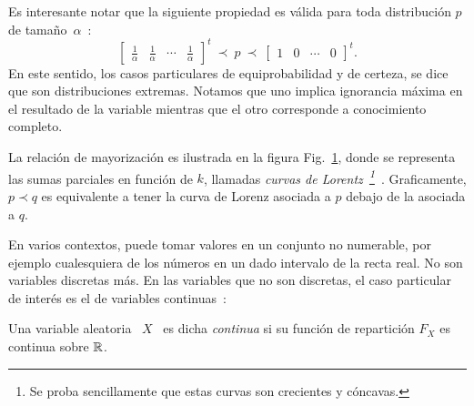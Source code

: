 Es  interesante  notar  que  la   siguiente  propiedad  es  v\'alida  para  toda
distribuci\'on $p$ de tama\~no~$\alpha$~\cite[p.~9,
  (6)-(8)]{MarOlk11}:
%
\[
\begin{bmatrix}     \frac1\alpha      &     \frac1\alpha     &      \cdots     &
  \frac1\alpha \end{bmatrix}^t  \ \prec \  p \ \prec  \ \begin{bmatrix} 1 &  0 &
  \cdots & 0 \end{bmatrix}^t.
\]
%
En este  sentido, los  casos particulares de  equiprobabilidad y de  certeza, se
dice  que  son  distribuciones  extremas.  Notamos que  uno  implica  ignorancia
m\'axima  en el  resultado de  la variable  mientras que  el otro  corresponde a
conocimiento completo.

La    relaci\'on    de    mayorizaci\'on    es   ilustrada    en    la    figura
Fig.~\ref{fig:MP:mayorizacionplot}, donde  se representa las  sumas parciales en
funci\'on   de  $k$,   llamadas  {\em   curvas  de   Lorentz~\footnote{Se  proba
    sencillamente      que      estas      curvas     son      crecientes      y
    c\'oncavas.}}~\cite{MarOlk11,   Lor05}.  Graficamente,   $p   \prec  q$   es
equivalente a tener  la curva de Lorenz  asociada a $p$ debajo de  la asociada a
$q$.
%
\begin{figure}[h!]
\begin{center}  \end{center}
%
\label{fig:MP:mayorizacionplot}
\end{figure}



\label{Ssec:MP:VAContinua}

En  varios contextos,  puede  tomar valores  en  un conjunto  no numerable,  por
ejemplo cualesquiera de los n\'umeros en un dado intervalo de la recta real.  No
son variables  discretas m\'as. En las  variables que no son  discretas, el caso
particular de inter\'es es el de variables continuas~\cite{AthLah06, HogMck13}:
%
\begin{definicion}
  Una variable  aleatoria \  $X$ \ es  dicha {\it  continua} si su  funci\'on de
  repartici\'on  $F_X$ es  continua sobre  $\mathbb{R}$.
\end{definicion}

